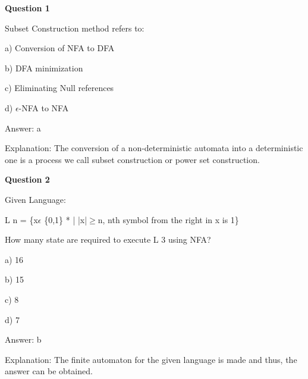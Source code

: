 \documentclass{article}
\begin{document}
\begin{mdframed}[linewidth=1pt, roundcorner=5pt, linecolor=gray!30, backgroundcolor=gray!5]
\textbf{Question 1} 

Subset Construction method refers to:

a) Conversion of NFA to DFA

b) DFA minimization

c) Eliminating Null references

d) $\epsilon$-NFA to NFA
\vspace{5pt} \par
\begin{tcolorbox}[colback=green!5, colframe=green!40!black, title=Solution]
Answer: a

Explanation:  The conversion of a non-deterministic automata into a deterministic one is a process we call subset construction or power set construction.
\end{tcolorbox}
\end{mdframed}

\begin{mdframed}[linewidth=1pt, roundcorner=5pt, linecolor=gray!30, backgroundcolor=gray!5]
\textbf{Question 2} 

Given Language:

L
n
= \{x$\epsilon$ \{0,1\} * | |x|$\geq$n, nth symbol from the right in x is 1\}

How many state are required to execute L
3
 using NFA?

a) 16

b) 15

c) 8

d) 7
\vspace{5pt} \par
\begin{tcolorbox}[colback=green!5, colframe=green!40!black, title=Solution]
Answer: b

Explanation: The finite automaton for the given language is made and thus, the answer can be obtained.
\end{tcolorbox}
\end{mdframed}
\newpage
\end{document}
